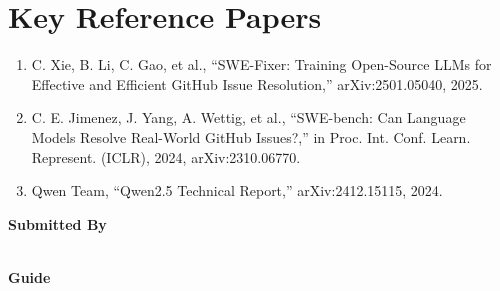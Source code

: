 \documentclass[11pt]{article}
\begin{document}
\section*{Key Reference Papers}
\begin{enumerate}
  \item C. Xie, B. Li, C. Gao, et al., ``SWE-Fixer: Training Open-Source LLMs for Effective and Efficient GitHub Issue Resolution,'' arXiv:2501.05040, 2025.
  \item C. E. Jimenez, J. Yang, A. Wettig, et al., ``SWE-bench: Can Language Models Resolve Real-World GitHub Issues?,'' in Proc. Int. Conf. Learn. Represent. (ICLR), 2024, arXiv:2310.06770.
  \item Qwen Team, ``Qwen2.5 Technical Report,'' arXiv:2412.15115, 2024.
\end{enumerate}
\vspace{0.8em}
\noindent\textbf{Submitted By}\\
\seminarName\\
\seminarRoll

\vspace{0.6em}
\noindent\textbf{Guide}\\
\seminarGuide
\end{document}
